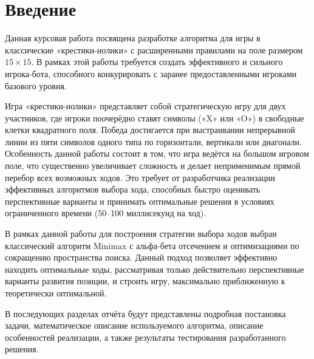 \section*{Введение}

Данная курсовая работа посвящена разработке алгоритма для игры в классические «крестики-нолики» с расширенными правилами на поле размером $15 \times 15$.  В рамках этой работы требуется создать эффективного и сильного игрока-бота, способного конкурировать с заранее предоставленными игроками базового уровня.

Игра «крестики-нолики» представляет собой стратегическую игру для двух участников, где игроки поочерёдно ставят символы («X» или «O») в свободные клетки квадратного поля. Победа достигается при выстраивании непрерывной линии из пяти символов одного типа по горизонтали, вертикали или диагонали. Особенность данной работы состоит в том, что игра ведётся на большом игровом поле, что существенно увеличивает сложность и делает неприменимым прямой перебор всех возможных ходов. Это требует от разработчика реализации эффективных алгоритмов выбора хода, способных быстро оценивать перспективные варианты и принимать оптимальные решения в условиях ограниченного времени (50–100 миллисекунд на ход).

В рамках данной работы для построения стратегии выбора ходов выбран классический алгоритм Minimax с альфа-бета отсечением и оптимизациями по сокращению пространства поиска. Данный подход позволяет эффективно находить оптимальные ходы, рассматривая только действительно перспективные варианты развития позиции, и строить игру, максимально приближенную к теоретически оптимальной.

В последующих разделах отчёта будут представлены подробная постановка задачи, математическое описание используемого алгоритма, описание особенностей реализации, а также результаты тестирования разработанного решения.